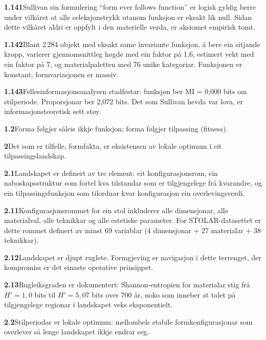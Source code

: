 \documentclass[10pt, a4paper, twocolumn]{article}
\begin{document}
\medskip
\noindent\textbf{1.141}\quad Sullivan sin formulering ``form ever follows function'' er logisk gyldig berre under vilkåret at alle seleksjonstrykk utanom funksjon er eksakt lik null. Sidan dette vilkåret aldri er oppfylt i den materielle verda, er aksiomet empirisk tomt.

\medskip
\noindent\textbf{1.142}\quad Blant 2\,284 objekt med eksakt same invariante funksjon, å bere ein sitjande kropp, varierer gjennomsnittleg høgde med ein faktor på 1,6, estimert vekt med ein faktor på 7, og materialpaletten med 76 unike kategoriar. Funksjonen er konstant; formvariasjonen er massiv.

\medskip
\noindent\textbf{1.143}\quad Fellesinformasjonsanalysen stadfestar: funksjon ber MI = 0,000 bits om stilperiode. Proporsjonar ber 2,072 bits. Det som Sullivan hevda var lova, er informasjonsteoretisk sett støy.

\medskip
\noindent\textbf{1.2}\quad Forma følgjer såleis ikkje funksjon; forma følgjer tilpassing (fitness).

\bigskip

\noindent\textbf{2}\quad Det som er tilfelle, formfakta, er eksistensen av lokale optimum i eit tilpassingslandskap.

\medskip
\noindent\textbf{2.1}\quad Landskapet er definert av tre element: eit konfigurasjonsrom, ein naboskapsstruktur som fortel kva tilstandar som er tilgjengelege frå kvarandre, og ein tilpassingsfunksjon som tilordnar kvar konfigurasjon ein overlevingsverdi.

\medskip
\noindent\textbf{2.11}\quad Konfigurasjonsrommet for ein stol inkluderer alle dimensjonar, alle materialval, alle teknikkar og alle estetiske parameter. For STOLAR-datasettet er dette rommet definert av minst 69 variablar (4 dimensjonar + 27 materialar + 38 teknikkar).

\medskip
\noindent\textbf{2.12}\quad Landskapet er djupt ruglete. Formgjeving er navigasjon i dette terrenget, der kompromiss er det einaste operative prinsippet.

\medskip
\noindent\textbf{2.13}\quad Rugleiksgraden er dokumentert: Shannon-entropien for materialar stig frå $H' = 1{,}0$ bits til $H' = 5{,}07$ bits over 700 år, noko som inneber at talet på tilgjengelege regionar i landskapet veks eksponentielt.

\medskip
\noindent\textbf{2.2}\quad Stilperiodar er lokale optimum: mellombels stabile formkonfigurasjonar som overlever så lenge landskapet ikkje endrar seg.
\end{document}
